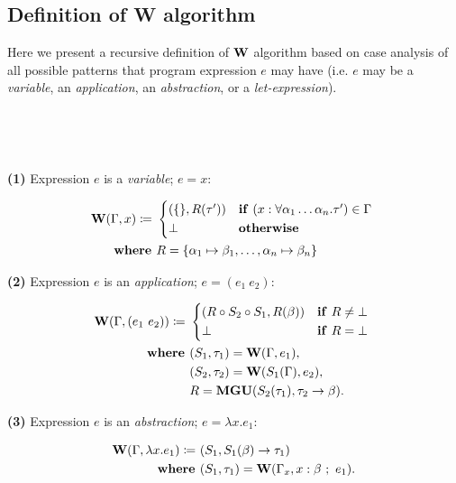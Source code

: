 \documentclass[a4paper,oneside]{memoir}
\begin{document}
\subsection{Definition of W algorithm}

Here we present a recursive definition of $\operatorname{\textbf{W}}$ algorithm based on case analysis of all possible patterns that program expression $e$ may have 
(i.e. $e$ may be a \textit{variable}, an \textit{application}, an \textit{abstraction}, or a \textit{let-expression}). 

~



~

\textbf{(1)} Expression $e$ is a \textit{variable}; $e = x$:

\begin{align*}
\W(\Gamma, x) \defi ~ &
\begin{cases*}
  (\{\}, R(\tauPr) ) 
  & \textbf{if} $(x : \forall \alpha_1 \dots \alpha_n.\tauPr) \in \Gamma$  \\
  \bot & \textbf{otherwise}
\end{cases*}\\
\where & R = \{\alpha_1 \mapsto \beta_1, \dots, \alpha_n \mapsto \beta_n\} \\
\end{align*}


\textbf{(2)} Expression $e$ is an \textit{application}; $e = (e_1~e_2)$:

\begin{align*}
\W(\Gamma, (e_1~e_2)) \defi ~ & 
\begin{cases*}
  (R \circ S_2 \circ S_1, R(\beta) ) & \textbf{if} $R \neq \bot$ \\
  \bot & \textbf{if} $R = \bot$
\end{cases*}\\
\where & (S_1, \tau_1) = \W(\Gamma, e_1), \\
       & (S_2, \tau_2) = \W(S_1(\Gamma), e_2), \\
       & R = \Mgu( S_2(\tau_1), \tau_2 \ar \beta ).\\
\end{align*}


\textbf{(3)} Expression $e$ is an \textit{abstraction}; $e = \lambda x . e_1$:

\begin{align*}
\operatorname{\textbf{W}}(\Gamma, \lambda x .e_1) \coloneqq ~ & (S_1, S_1(\beta) \rightarrow \tau_1 ) \\
\operatorname{\textbf{where~}} & (S_1, \tau_1) = \operatorname{\textbf{W}}(\Gamma_x, x : \beta ~;~ e_1). \\
\end{align*}
\end{document}
